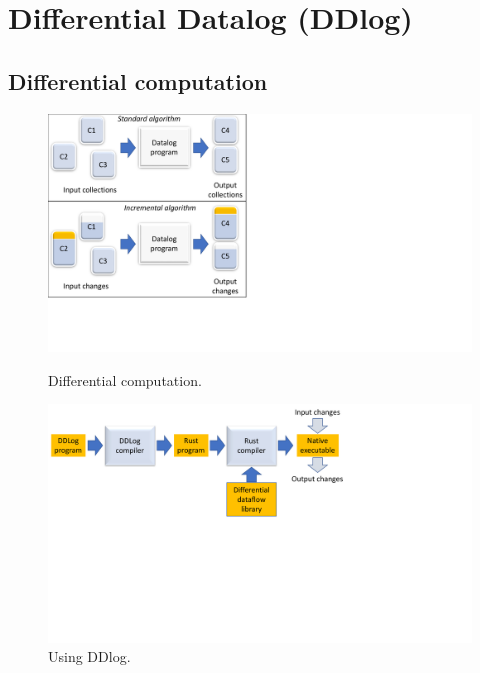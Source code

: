 \section{Differential Datalog (DDlog)}\label{sec-ddlog}

\subsection{Differential computation}

\begin{figure}[t]
  \begin{minipage}{.5\textwidth}
    \includegraphics[width=\columnwidth,clip=true,trim=0in 1.7in 6.5in
      0in]{differential.pdf}
    \caption{Differential computation.\label{fig:differential}}
  \end{minipage} \hfill
  \begin{minipage}{.5\textwidth}
    \includegraphics[width=\columnwidth,clip=true,trim=0in 4in 4in
      0in]{compiler-flow.pdf}
    \caption{Using DDlog.\label{fig:compiler-flow}}
  \end{minipage}
\end{figure}

